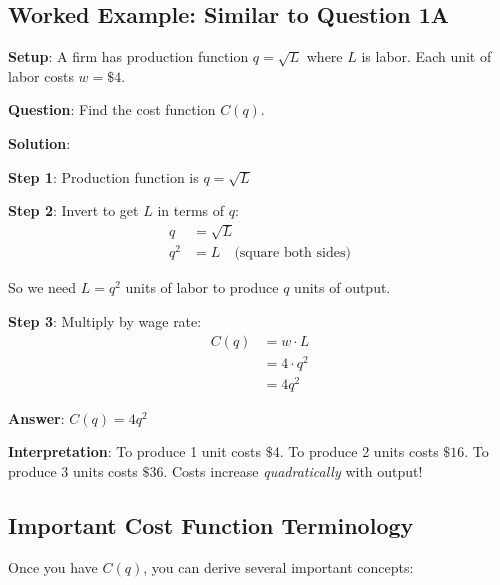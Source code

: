 \documentclass[12pt]{article}
\begin{document}
\newpage

\subsection{Worked Example: Similar to Question 1A}

\begin{example}
\textbf{Setup}: A firm has production function $q = \sqrt{L}$ where $L$ is labor. Each unit of labor costs $w = \$4$.

\textbf{Question}: Find the cost function $C(q)$.

\vspace{0.3cm}
\textbf{Solution}:

\textbf{Step 1}: Production function is $q = \sqrt{L}$

\textbf{Step 2}: Invert to get $L$ in terms of $q$:
\begin{align*}
q &= \sqrt{L} \\
q^2 &= L \quad \text{(square both sides)}
\end{align*}

So we need $L = q^2$ units of labor to produce $q$ units of output.

\textbf{Step 3}: Multiply by wage rate:
\begin{align*}
C(q) &= w \cdot L \\
&= 4 \cdot q^2 \\
&= 4q^2
\end{align*}

\textbf{Answer}: $C(q) = 4q^2$

\vspace{0.3cm}
\textbf{Interpretation}: To produce 1 unit costs $\$4$. To produce 2 units costs $\$16$. To produce 3 units costs $\$36$. Costs increase \textit{quadratically} with output!
\end{example}

\subsection{Important Cost Function Terminology}

Once you have $C(q)$, you can derive several important concepts:
\end{document}

